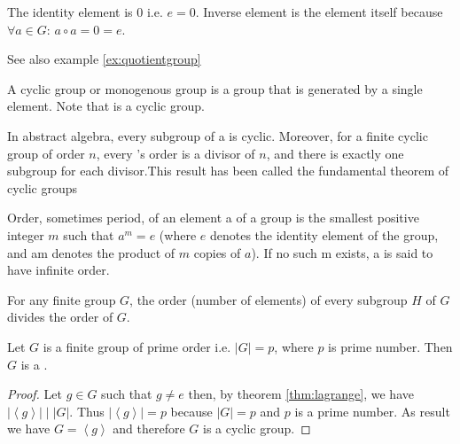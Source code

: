 \begin{appendices}
\begin{example}
  The identity element is $0$ i.e. $e = 0$.
  Inverse element is the element itself
  because $\forall a \in G$: $a \circ a = 0 = e$.

  See also example \ref{ex:quotientgroup}
  \label{ex:groupZ2}
\end{example}

\begin{definition}
  A cyclic group or monogenous group is a group that is generated by a
  single element.
  Note that  is a cyclic group.
  \label{def:cyclicgroup}
\end{definition}

\begin{theorem}
  In abstract algebra, every subgroup of a  is
  cyclic. Moreover, for a finite cyclic group of order $n$, every
  's order is a divisor of $n$, and there is
  exactly one subgroup for each divisor.This result has been called the
  fundamental theorem of cyclic groups
  \cite{wiki:subgroups_of_cyclic_groups}
  \label{thm:fundamentaltheoremofcyclicgroup}
\end{theorem}

\begin{definition}
  Order, sometimes period, of an element a of a group is the smallest
  positive integer $m$ such that $a^m = e$ (where $e$ denotes the identity
  element of the group, and am denotes the product of $m$ copies of
  $a$). If no such m exists, a is said to have infinite order.
  \label{def:grouporder}
\end{definition}

\begin{theorem}[Lagrange]
  For any finite group $G$, the order (number of elements) of every
  subgroup $H$ of $G$ divides the order of $G$. 
  \label{thm:lagrange}
\end{theorem}

\begin{theorem}
  Let $G$ is a finite group of prime order i.e.
  $\left|G\right| = p$, where $p$ is prime number. Then $G$ is a
  . 
  \label{thm:finite_group_of_prime_order}
  \begin{proof}
    Let $g \in G$ such that $g \ne e$ then, by theorem
    \ref{thm:lagrange},
    we have 
    $\left|\left<g\right>\right| \mid \left|G\right|$. Thus
    $\left|\left<g\right>\right| = p$ because 
    $\left|G\right| = p$ and $p$ is a prime number. As result we have
    $G = \left<g\right>$ and therefore $G$ is a cyclic group.
  \end{proof}
\end{theorem}


\end{appendices}

